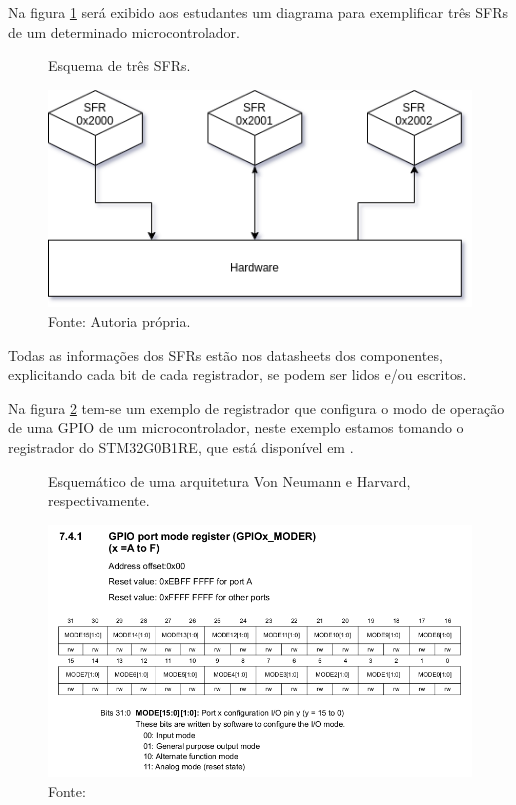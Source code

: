 \documentclass[12pt,a4paper]{report}
\begin{document}
Na figura \ref{fig:srf_example} será exibido aos estudantes um diagrama para exemplificar três SFRs de um determinado microcontrolador.

\begin{figure}[H]      %
    \begin{center}		   %
    \caption{Esquema de três SFRs.}		%
    \includegraphics[scale=0.65]{fig/sfr_example.png}
    \caption*{Fonte: Autoria própria.}
    \label{fig:srf_example}
    \end{center}
\end{figure}

Todas as informações dos SFRs estão nos datasheets dos componentes, explicitando cada bit de cada registrador, se podem ser lidos e/ou escritos.

Na figura \ref{fig:gpio_port_mode} tem-se um exemplo de registrador que configura o modo de operação de uma GPIO de um microcontrolador, neste exemplo estamos tomando o registrador do STM32G0B1RE, que está disponível em \cite{ci:rm0444}.


\begin{figure}[H]      %
    \begin{center}		   %
    \caption{Esquemático de uma arquitetura Von Neumann e Harvard, respectivamente.}		%
    \includegraphics[scale=0.5]{fig/gpio_port_mode.png}
    \caption*{Fonte: \cite{ci:rm0444}}
    \label{fig:gpio_port_mode}
    \end{center}
\end{figure}
\end{document}
